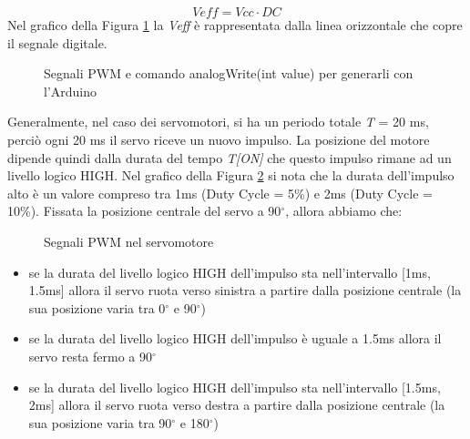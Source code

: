 \documentclass[12pt]{report}
\begin{document}
%
\[Veff = Vcc \cdot DC\]
%
Nel grafico della Figura \ref{fig:pwm} la \textit{Veff} è rappresentata dalla linea orizzontale che copre il segnale digitale.

\begin{figure}
	\caption{Segnali PWM e comando analogWrite(int value) per generarli con l'Arduino}
	\label{fig:pwm}
\end{figure}

Generalmente, nel caso dei servomotori, si ha un periodo totale \textit{T} = 20 ms, perciò ogni 20 ms il servo riceve un nuovo impulso. La posizione del motore dipende quindi dalla durata del tempo \textit{T[ON]} che questo impulso rimane ad un livello logico HIGH. Nel grafico della Figura \ref{fig:servo_pwm} si nota che la durata dell'impulso alto è un valore compreso tra 1ms (Duty Cycle = 5\%) e 2ms (Duty Cycle = 10\%). Fissata la posizione centrale del servo a 90$^{\circ}$, allora abbiamo che: 


\begin{figure}
	\caption{Segnali PWM nel servomotore}
	\label{fig:servo_pwm}
\end{figure}


\begin{itemize}
	\item se la durata del livello logico HIGH dell'impulso sta nell'intervallo [1ms, 1.5ms] allora il servo ruota verso sinistra a partire dalla posizione centrale (la sua posizione varia tra 0$^{\circ}$ e 90$^{\circ}$)
	\item se la durata del livello logico HIGH dell'impulso è uguale a 1.5ms allora il servo resta fermo a 90$^{\circ}$
	\item se la durata del livello logico HIGH dell'impulso sta nell'intervallo [1.5ms, 2ms] allora il servo ruota verso destra a partire dalla posizione centrale (la sua posizione varia tra 90$^{\circ}$ e 180$^{\circ}$)
\end{itemize}
\end{document}
